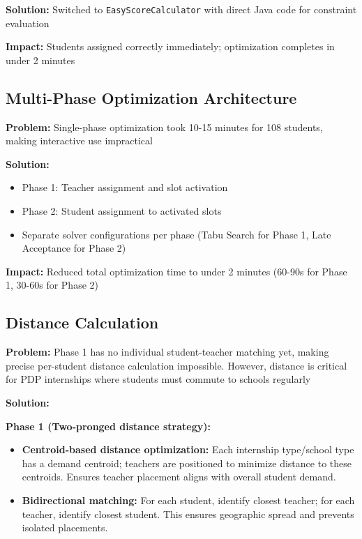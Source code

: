 \documentclass[12pt,a4paper]{report}
\begin{document}
\textbf{Solution:} Switched to \texttt{EasyScoreCalculator} with direct Java code for constraint evaluation

\textbf{Impact:} Students assigned correctly immediately; optimization completes in under 2 minutes

\subsection{Multi-Phase Optimization Architecture}

\textbf{Problem:} Single-phase optimization took 10-15 minutes for 108 students, making interactive use impractical

\textbf{Solution:} 
\begin{itemize}
    \item Phase 1: Teacher assignment and slot activation
    \item Phase 2: Student assignment to activated slots
    \item Separate solver configurations per phase (Tabu Search for Phase 1, Late Acceptance for Phase 2)
\end{itemize}

\textbf{Impact:} Reduced total optimization time to under 2 minutes (60-90s for Phase 1, 30-60s for Phase 2)

\subsection{Distance Calculation}

\textbf{Problem:} Phase 1 has no individual student-teacher matching yet, making precise per-student distance calculation impossible. However, distance is critical for PDP internships where students must commute to schools regularly

\textbf{Solution:} 

\textbf{Phase 1 (Two-pronged distance strategy):}
\begin{itemize}
    \item \textbf{Centroid-based distance optimization:} Each internship type/school type has a demand centroid; teachers are positioned to minimize distance to these centroids. Ensures teacher placement aligns with overall student demand.
    
    \item \textbf{Bidirectional matching:} For each student, identify closest teacher; for each teacher, identify closest student. This ensures geographic spread and prevents isolated placements.
\end{itemize}
\end{document}
